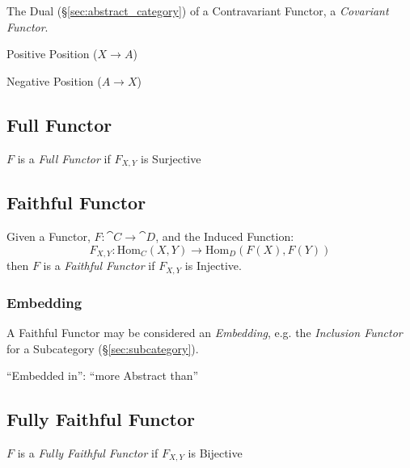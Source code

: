 The Dual (\S\ref{sec:abstract_category}) of a Contravariant
Functor, a \emph{Covariant Functor}.

Positive Position ($X \rightarrow A$)

Negative Position ($A \rightarrow X$)



\subsection{Full Functor}\label{sec:full_functor}

$F$ is a \emph{Full Functor} if $F_{X,Y}$ is Surjective



\subsection{Faithful Functor}\label{sec:faithful_functor}

Given a Functor, $F : \cat{C} \rightarrow \cat{D}$, and the Induced Function:
\[
  F_{X,Y} : \mathrm{Hom}_C(X,Y) \rightarrow \mathrm{Hom}_D(F(X),F(Y))
\]
then $F$ is a \emph{Faithful Functor} if $F_{X,Y}$ is Injective.



\subsubsection{Embedding}\label{sec:category_embedding}

A Faithful Functor may be considered an \emph{Embedding}, e.g. the
\emph{Inclusion Functor} for a Subcategory (\S\ref{sec:subcategory}).

``Embedded in'': ``more Abstract than''



\subsection{Fully Faithful Functor}\label{sec:fully_faithful}

$F$ is a \emph{Fully Faithful Functor} if $F_{X,Y}$ is Bijective

